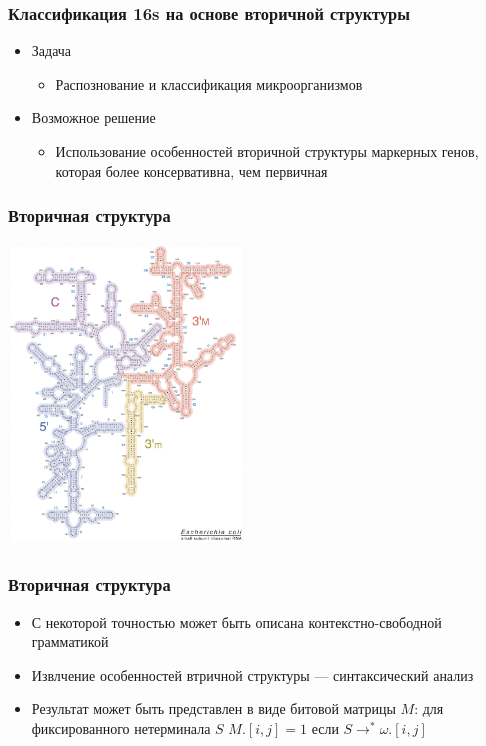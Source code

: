 \documentclass{beamer}
\begin{document}
\begin{frame}[fragile]
\transwipe[direction=90]
\frametitle{Классификация 16s на основе вторичной структуры}
  \begin{itemize}
    \item Задача
    \begin{itemize}
       \item Распознование и классификация микроорганизмов 
    \end{itemize}
    \item Возможное решение
    \begin{itemize}
       \item Использование особенностей вторичной структуры маркерных генов, которая более консервативна, чем первичная
    \end{itemize}
  \end{itemize}
  
\end{frame}

\begin{frame}[fragile]
\transwipe[direction=90]
\frametitle{Вторичная структура}
  
   \begin{center}
      \includegraphics[height=8cm]{pictures/ecoli_16s.jpg}
    \end{center}
  
\end{frame}


\begin{frame}[fragile]
\transwipe[direction=90]
\frametitle{Вторичная структура}
  
  \begin{itemize}
    \item С некоторой точностью может быть описана контекстно-свободной грамматикой
    \item Извлчение особенностей втричной структуры --- синтаксический анализ
    \item Результат может быть представлен в виде битовой матрицы $M$: для фиксированного нетерминала $S$ $M.[i,j] = 1$ если $S \rightarrow^* \omega.[i,j]$
  \end{itemize}
  
\end{frame}
\end{document}
